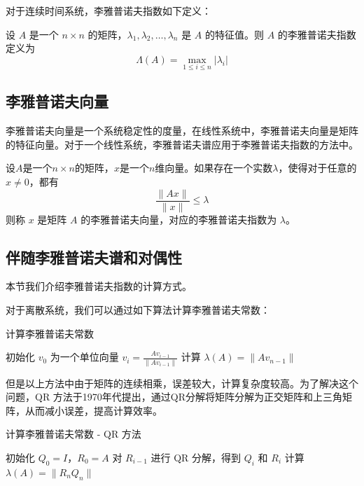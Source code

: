 \documentclass[12pt,a4paper]{amsart}
\begin{document}
对于连续时间系统，李雅普诺夫指数如下定义：

\begin{definition}
设 $A$ 是一个 $n\times n$ 的矩阵，$\lambda_1,\lambda_2,\ldots,\lambda_n$ 是 $A$ 的特征值。则 $A$ 的李雅普诺夫指数定义为
\[
\Lambda(A)=\max_{1\leq i\leq n}|\lambda_i|
\]
\end{definition}

\subsection{李雅普诺夫向量}

李雅普诺夫向量是一个系统稳定性的度量，在线性系统中，李雅普诺夫向量是矩阵的特征向量。对于一个线性系统，李雅普诺夫谱应用于李雅普诺夫指数的方法中。

\begin{definition}[李雅普诺夫向量]
设$A$是一个$n\times n$的矩阵，$x$是一个$n$维向量。如果存在一个实数$\lambda$，使得对于任意的$x\neq 0$，都有
\[
\frac{\|Ax\|}{\|x\|}\leq \lambda
\]
则称 $x$ 是矩阵 $A$ 的李雅普诺夫向量，对应的李雅普诺夫指数为 $\lambda$。
\end{definition}

\subsection{伴随李雅普诺夫谱和对偶性}

本节我们介绍李雅普诺夫指数的计算方式。

对于离散系统，我们可以通过如下算法计算李雅普诺夫常数：

\begin{algorithm}[htbp]
\caption{计算李雅普诺夫常数}
\begin{algorithmic}[1]
\State 初始化 $v_0$ 为一个单位向量
\State $v_i = \frac{Av_{i-1}}{\|Av_{i-1}\|}$
\EndFor
\State 计算 $\lambda(A)=\|Av_{n-1}\|$
\end{algorithmic}
\end{algorithm}

但是以上方法中由于矩阵的连续相乘，误差较大，计算复杂度较高。为了解决这个问题，QR 方法于1970年代提出，通过QR分解将矩阵分解为正交矩阵和上三角矩阵，从而减小误差，提高计算效率。

\begin{algorithm}[htbp]
\caption{计算李雅普诺夫常数 - QR 方法}
\begin{algorithmic}[1]
\State 初始化 $Q_0=I$，$R_0=A$
\State 对 $R_{i-1}$ 进行 QR 分解，得到 $Q_i$ 和 $R_i$
\EndFor
\State 计算 $\lambda(A)=\|R_nQ_n\|$
\end{algorithmic}
\end{algorithm}
\end{document}
